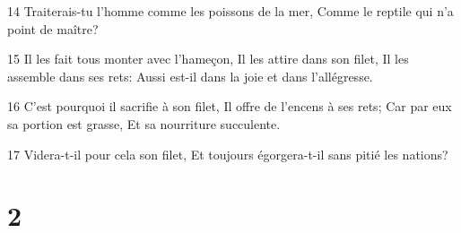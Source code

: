 \par 14 Traiterais-tu l'homme comme les poissons de la mer, Comme le reptile qui n'a point de maître?
\par 15 Il les fait tous monter avec l'hameçon, Il les attire dans son filet, Il les assemble dans ses rets: Aussi est-il dans la joie et dans l'allégresse.
\par 16 C'est pourquoi il sacrifie à son filet, Il offre de l'encens à ses rets; Car par eux sa portion est grasse, Et sa nourriture succulente.
\par 17 Videra-t-il pour cela son filet, Et toujours égorgera-t-il sans pitié les nations?

\chapter{2}

